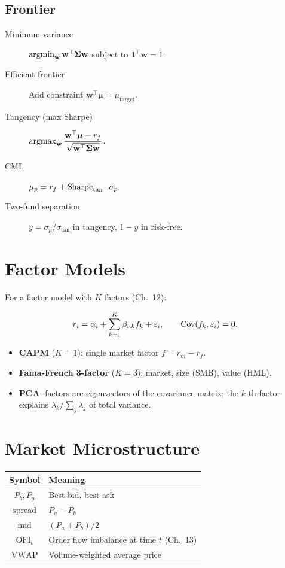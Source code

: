 \subsection{Frontier}

\begin{description}
    \item[Minimum variance] $\operatorname*{argmin}_{\mathbf{w}} \mathbf{w}^\top \boldsymbol{\Sigma} \mathbf{w}$ subject to $\mathbf{1}^\top \mathbf{w} = 1$.
    \item[Efficient frontier] Add constraint $\mathbf{w}^\top \boldsymbol{\mu} = \mu_{\text{target}}$.
    \item[Tangency (max Sharpe)] $\operatorname*{argmax}_{\mathbf{w}} \dfrac{\mathbf{w}^\top \boldsymbol{\mu} - r_f}{\sqrt{\mathbf{w}^\top \boldsymbol{\Sigma} \mathbf{w}}}$.
    \item[CML] $\mu_p = r_f + \text{Sharpe}_{\text{tan}} \cdot \sigma_p$.
    \item[Two-fund separation] $y = \sigma_p / \sigma_{\text{tan}}$ in tangency, $1 - y$ in risk-free.
\end{description}

\section{Factor Models}

For a factor model with $K$ factors (Ch.~12):

\begin{align}
r_i = \alpha_i + \sum_{k=1}^{K} \beta_{i,k} f_k + \varepsilon_i,
\qquad \text{Cov}(f_k, \varepsilon_i) = 0.
\end{align}

\begin{itemize}
    \item \textbf{CAPM} ($K=1$): single market factor $f = r_m - r_f$.
    \item \textbf{Fama-French 3-factor} ($K=3$): market, size (SMB), value (HML).
    \item \textbf{PCA}: factors are eigenvectors of the covariance matrix;
      the $k$-th factor explains $\lambda_k / \sum_j \lambda_j$ of total variance.
\end{itemize}

\section{Market Microstructure}

\begin{center}
\begin{tabular}{cl}
\toprule
\textbf{Symbol} & \textbf{Meaning} \\
\midrule
$P_b, P_a$ & Best bid, best ask \\
$\text{spread}$ & $P_a - P_b$ \\
$\text{mid}$ & $(P_a + P_b) / 2$ \\
$\text{OFI}_t$ & Order flow imbalance at time $t$ (Ch.~13) \\
$\text{VWAP}$ & Volume-weighted average price \\
\bottomrule
\end{tabular}
\end{center}

